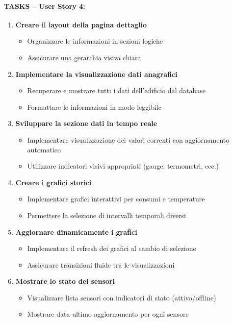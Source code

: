 \paragraph*{TASKS – User Story 4:}
\begin{enumerate}
    \item \textbf{Creare il layout della pagina dettaglio}
    \begin{itemize}
        \item Organizzare le informazioni in sezioni logiche
        \item Assicurare una gerarchia visiva chiara
    \end{itemize}
    \item \textbf{Implementare la visualizzazione dati anagrafici}
    \begin{itemize}
        \item Recuperare e mostrare tutti i dati dell'edificio dal database
        \item Formattare le informazioni in modo leggibile
    \end{itemize}
    \item \textbf{Sviluppare la sezione dati in tempo reale}
    \begin{itemize}
        \item Implementare visualizzazione dei valori correnti con aggiornamento automatico
        \item Utilizzare indicatori visivi appropriati (gauge, termometri, ecc.)
    \end{itemize}
    \item \textbf{Creare i grafici storici}
    \begin{itemize}
        \item Implementare grafici interattivi per consumi e temperature
        \item Permettere la selezione di intervalli temporali diversi
    \end{itemize}
    \item \textbf{Aggiornare dinamicamente i grafici}
    \begin{itemize}
        \item Implementare il refresh dei grafici al cambio di selezione
        \item Assicurare transizioni fluide tra le visualizzazioni
    \end{itemize}
    \item \textbf{Mostrare lo stato dei sensori}
    \begin{itemize}
        \item Visualizzare lista sensori con indicatori di stato (attivo/offline)
        \item Mostrare data ultimo aggiornamento per ogni sensore
    \end{itemize}
\end{enumerate}


